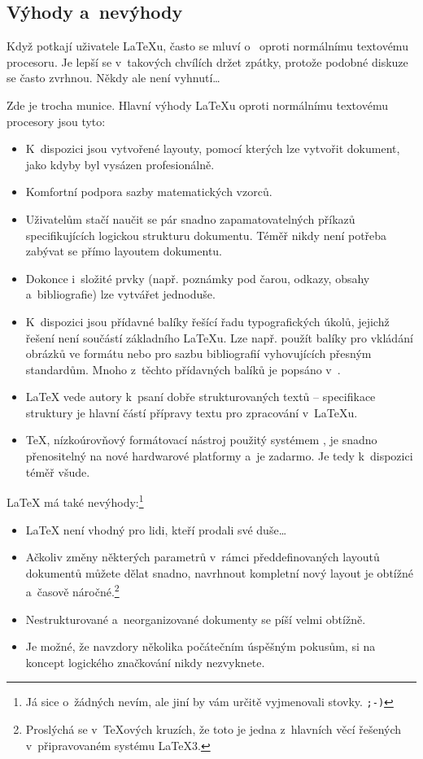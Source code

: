 \subsection{Výhody a~nevýhody}
Když  potkají uživatele \LaTeX u, často
se mluví o~ oproti normálnímu textovému
procesoru. Je lepší se v~takových chvílích držet zpátky, protože
podobné diskuze se často zvrhnou. Někdy ale není vyhnutí\ldots

\medskip\noindent Zde je trocha munice. Hlavní výhody
\LaTeX u oproti normálnímu textovému procesory jsou tyto:

\begin{itemize}

\item K~dispozici jsou vytvořené layouty, pomocí
kterých lze vytvořit dokument, jako kdyby byl vysázen profesionálně.
\item Komfortní podpora sazby matematických vzorců.
\item Uživatelům stačí naučit se pár snadno zapamatovatelných příkazů
  specifikujících logickou strukturu dokumentu. Téměř nikdy není
  potřeba zabývat se přímo layoutem dokumentu.
\item Dokonce i~složité prvky (např. poznámky pod čarou, odkazy,
  obsahy a~bibliografie) lze vytvářet jednoduše.
\item K~dispozici jsou přídavné balíky řešící řadu typografických
  úkolů, jejichž řešení není součástí základního \LaTeX u. Lze např.
  použít balíky pro vkládání obrázků ve formátu \PSib{} nebo pro
  sazbu bibliografií vyhovujících přesným standardům. Mnoho z~těchto
  přídavných balíků je popsáno v~\companion.
\item \LaTeX{} vede autory k~psaní dobře strukturovaných textů --
  specifikace struktury je hlavní částí přípravy textu pro zpracování
  v~\LaTeX u.
\item \TeX, nízkoúrovňový formátovací nástroj použitý systémem \LaTeXe, 
  je snadno přenositelný na nové hardwarové platformy a~je zadarmo.
  Je tedy k~dispozici téměř všude.

%
%
\end{itemize}

\medskip

\noindent\LaTeX{} má také nevýhody:\footnote{Já sice o~žádných nevím,
ale jiní by vám určitě vyjmenovali stovky. \texttt{;-)}}

\begin{itemize}
\item \LaTeX{} není vhodný pro lidi, kteří prodali své duše\ldots
\item Ačkoliv změny některých parametrů v~rámci předdefinovaných layoutů 
  dokumentů můžete dělat snadno, navrhnout kompletní nový layout
  je obtížné a~časově náročné.\footnote{Proslýchá se v~\TeX ových kruzích, že toto je jedna
  z~hlavních věcí řešených v~připravovaném systému \LaTeX3.}
\item Nestrukturované a~neorganizované dokumenty se píší velmi obtížně.
\item Je možné, že navzdory několika počátečním úspěšným pokusům, si
  na koncept logického značkování nikdy nezvyknete.
\end{itemize}


